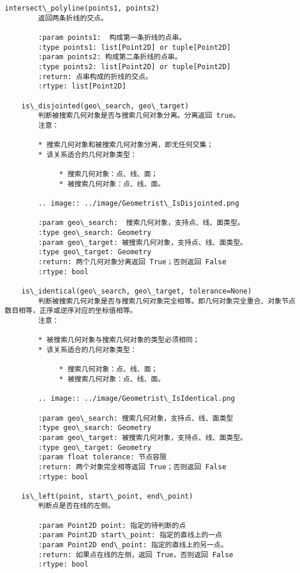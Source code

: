 \documentclass[11pt]{article}
\begin{document}
\begin{Verbatim}[commandchars=\\\{\}]
    intersect\_polyline(points1, points2)
        返回两条折线的交点。
        
        :param points1:  构成第一条折线的点串。
        :type points1: list[Point2D] or tuple[Point2D]
        :param points2: 构成第二条折线的点串。
        :type points2: list[Point2D] or tuple[Point2D]
        :return: 点串构成的折线的交点。
        :rtype: list[Point2D]
    
    is\_disjointed(geo\_search, geo\_target)
        判断被搜索几何对象是否与搜索几何对象分离。分离返回 true。
        注意：
        
        * 搜索几何对象和被搜索几何对象分离，即无任何交集；
        * 该关系适合的几何对象类型：
        
             * 搜索几何对象：点、线、面；
             * 被搜索几何对象：点、线、面。
        
        .. image:: ../image/Geometrist\_IsDisjointed.png
        
        :param geo\_search:  搜索几何对象，支持点、线、面类型。
        :type geo\_search: Geometry
        :param geo\_target: 被搜索几何对象，支持点、线、面类型。
        :type geo\_target: Geometry
        :return: 两个几何对象分离返回 True；否则返回 False
        :rtype: bool
    
    is\_identical(geo\_search, geo\_target, tolerance=None)
        判断被搜索几何对象是否与搜索几何对象完全相等。即几何对象完全重合、对象节点数目相等，正序或逆序对应的坐标值相等。
        注意：
        
        * 被搜索几何对象与搜索几何对象的类型必须相同；
        * 该关系适合的几何对象类型：
        
             * 搜索几何对象：点、线、面；
             * 被搜索几何对象：点、线、面。
        
        .. image:: ../image/Geometrist\_IsIdentical.png
        
        :param geo\_search: 搜索几何对象，支持点、线、面类型
        :type geo\_search: Geometry
        :param geo\_target: 被搜索几何对象，支持点、线、面类型。
        :type geo\_target: Geometry
        :param float tolerance: 节点容限
        :return: 两个对象完全相等返回 True；否则返回 False
        :rtype: bool
    
    is\_left(point, start\_point, end\_point)
        判断点是否在线的左侧。
        
        :param Point2D point: 指定的待判断的点
        :param Point2D start\_point: 指定的直线上的一点
        :param Point2D end\_point: 指定的直线上的另一点。
        :return: 如果点在线的左侧，返回 True，否则返回 False
        :rtype: bool
    

\end{Verbatim}
\end{document}

